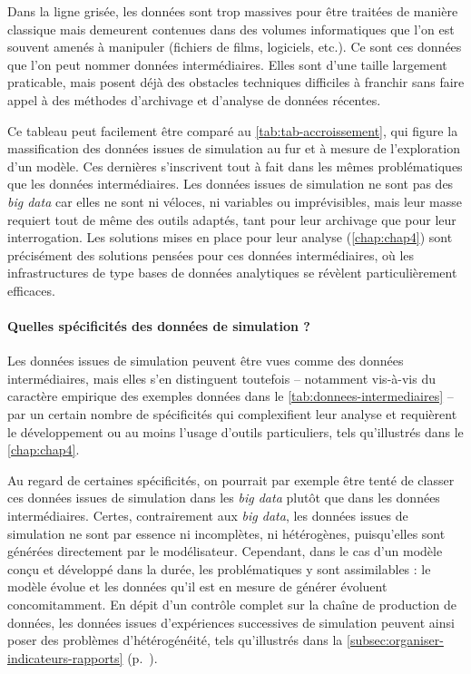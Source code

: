 Dans la ligne grisée, les données sont trop massives pour être traitées de manière classique mais demeurent contenues dans des volumes informatiques que l'on est souvent amenés à manipuler (fichiers de films, logiciels, etc.).
Ce sont ces données que l'on peut nommer \og données intermédiaires\fg{}.
Elles sont d'une taille largement praticable, mais posent déjà des obstacles techniques difficiles à franchir sans faire appel à des méthodes d'archivage et d'analyse de données récentes.

Ce tableau peut facilement être comparé au \cref{tab:tab-accroissement}, qui figure la massification des données issues de simulation au fur et à mesure de l'exploration d'un modèle.
Ces dernières s'inscrivent tout à fait dans les mêmes problématiques que les \og données intermédiaires\fg{}.
Les données issues de simulation ne sont pas des \textit{big data} car elles ne sont ni véloces, ni variables ou imprévisibles, mais leur masse requiert tout de même des outils adaptés, tant pour leur archivage que pour leur interrogation.
Les solutions mises en place pour leur analyse (\cref{chap:chap4}) sont précisément des solutions pensées pour ces données intermédiaires, où les infrastructures de type \og bases de données analytiques\fg{} se révèlent particulièrement efficaces.

\paragraph{Quelles spécificités des données de simulation ?}\label{par:specificites-donnees-simul}
Les données issues de simulation peuvent être vues comme des données intermédiaires, mais elles s'en distinguent toutefois -- notamment vis-à-vis du caractère empirique des exemples données dans le \cref{tab:donnees-intermediaires} -- par un certain nombre de spécificités qui complexifient leur analyse et requièrent le développement ou au moins l'usage d'outils particuliers, tels qu'illustrés dans le \cref{chap:chap4}.

Au regard de certaines spécificités, on pourrait par exemple être tenté de classer ces données issues de simulation dans les \textit{big data} plutôt que dans les données intermédiaires.
Certes, contrairement aux \textit{big data}, les données issues de simulation ne sont par essence ni incomplètes, ni hétérogènes, puisqu'elles sont générées directement par le modélisateur.
Cependant, dans le cas d'un modèle conçu et développé dans la durée, les problématiques y sont assimilables :
	le modèle évolue et les données qu'il est en mesure de générer évoluent concomitamment.
En dépit d'un contrôle complet sur la chaîne de production de données, les données issues d'expériences successives de simulation peuvent ainsi poser des problèmes d'hétérogénéité, tels qu'illustrés dans la \cref{subsec:organiser-indicateurs-rapports} (p.~).

